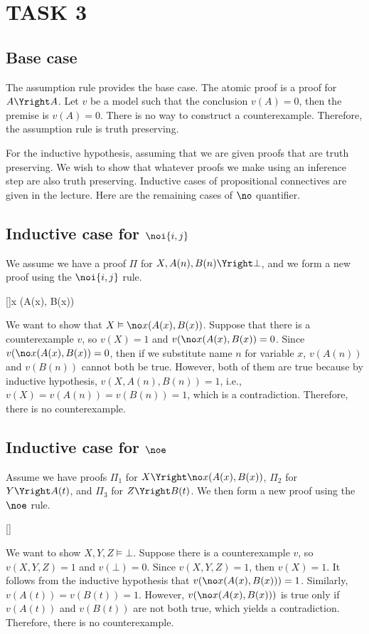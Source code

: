 \section*{TASK 3}
\subsection*{Base case}
The assumption rule provides the base case. The atomic proof is a proof for $A \Yright A$. Let $v$ be a model such that the conclusion $v(A) = 0$, then the premise is $v(A) = 0$. There is no way to construct a counterexample. Therefore, the assumption rule is truth preserving.

For the inductive hypothesis, assuming that we are given proofs that are truth preserving. We wish to show that whatever proofs we make using an inference step are also truth preserving. Inductive cases of propositional connectives are given in the lecture. Here are the remaining cases of $\no$ quantifier.

\subsection*{Inductive case for $\noi{i,j}$}
We assume we have a proof $\Pi$ for $X, A(n), B(n) \Yright \bot$, and we form a new proof using the $\noi{i,j}$ rule.
\begin{prooftree*}
[]{\no x (A(x), B(x))}
\end{prooftree*}
We want to show that $X \vDash \no x (A(x), B(x))$. Suppose that there is a counterexample $v$, so $v(X) = 1$ and $v(\no x (A(x), B(x)) = 0$. Since $v(\no x (A(x), B(x)) = 0$, then if we substitute name $n$ for variable $x$, $v(A(n))$ and $v(B(n))$ cannot both be true. However, both of them are true because by inductive hypothesis, $v(X, A(n), B(n)) = 1$, i.e., $v(X) = v(A(n)) = v(B(n)) = 1$, which is a contradiction. Therefore, there is no counterexample.

\subsection*{Inductive case for $\noe$}
Assume we have proofs $\Pi_1$ for $X \Yright \no x (A(x), B(x))$, $\Pi_2$ for $Y \Yright A(t)$, and $\Pi_3$ for $Z \Yright B(t)$. We then form a new proof using the $\noe$ rule.
\begin{prooftree*}
[\noe]{\bot}
\end{prooftree*}
We want to show $X,Y,Z \vDash \bot$. Suppose there is a counterexample $v$, so $v(X,Y,Z) = 1$ and $v(\bot) = 0$. Since $v(X,Y,Z) = 1$, then $v(X) = 1$. It follows from the inductive hypothesis that $v(\no x (A(x), B(x))) = 1$. Similarly, $v(A(t)) = v(B(t)) = 1$. However, $v(\no x (A(x), B(x)))$ is true only if $v(A(t))$ and $v(B(t))$ are not both true, which yields a contradiction. Therefore, there is no counterexample.
